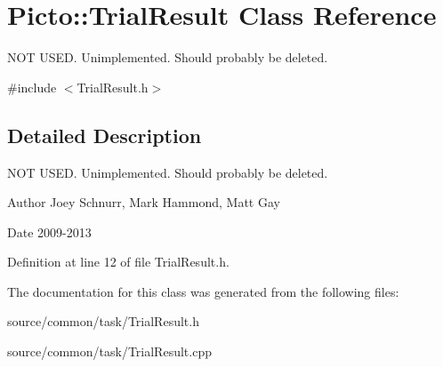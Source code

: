 \hypertarget{class_picto_1_1_trial_result}{\section{Picto\-:\-:Trial\-Result Class Reference}
\label{class_picto_1_1_trial_result}
}


N\-O\-T U\-S\-E\-D. Unimplemented. Should probably be deleted.  




{\ttfamily \#include $<$Trial\-Result.\-h$>$}



\subsection{Detailed Description}
N\-O\-T U\-S\-E\-D. Unimplemented. Should probably be deleted. 

\begin{DoxyAuthor}{Author}
Joey Schnurr, Mark Hammond, Matt Gay 
\end{DoxyAuthor}
\begin{DoxyDate}{Date}
2009-\/2013 
\end{DoxyDate}


Definition at line 12 of file Trial\-Result.\-h.



The documentation for this class was generated from the following files\-:\begin{DoxyCompactItemize}
\item 
source/common/task/Trial\-Result.\-h\item 
source/common/task/Trial\-Result.\-cpp\end{DoxyCompactItemize}
